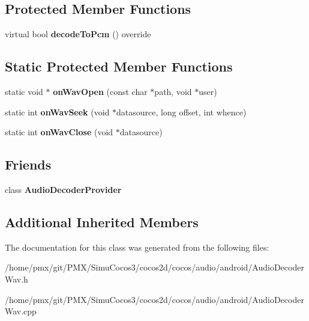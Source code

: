 \subsection*{Protected Member Functions}
\begin{DoxyCompactItemize}
\item 
\mbox{\label{classcocos2d_1_1experimental_1_1AudioDecoderWav_a8dc35ba05d20a358f7da7c50a9421eeb}} 
virtual bool {\bfseries decode\+To\+Pcm} () override
\end{DoxyCompactItemize}
\subsection*{Static Protected Member Functions}
\begin{DoxyCompactItemize}
\item 
\mbox{\label{classcocos2d_1_1experimental_1_1AudioDecoderWav_a69f52fea48fdbafb681dcbc8976777a8}} 
static void $\ast$ {\bfseries on\+Wav\+Open} (const char $\ast$path, void $\ast$user)
\item 
\mbox{\label{classcocos2d_1_1experimental_1_1AudioDecoderWav_afb2afd332edca8b36499f5af5c2cb76e}} 
static int {\bfseries on\+Wav\+Seek} (void $\ast$datasource, long offset, int whence)
\item 
\mbox{\label{classcocos2d_1_1experimental_1_1AudioDecoderWav_aef844d772ae05fcf7a86df585185dd6a}} 
static int {\bfseries on\+Wav\+Close} (void $\ast$datasource)
\end{DoxyCompactItemize}
\subsection*{Friends}
\begin{DoxyCompactItemize}
\item 
\mbox{\label{classcocos2d_1_1experimental_1_1AudioDecoderWav_afb46984384ce8b9caa8516e0a84944ef}} 
class {\bfseries Audio\+Decoder\+Provider}
\end{DoxyCompactItemize}
\subsection*{Additional Inherited Members}


The documentation for this class was generated from the following files\+:\begin{DoxyCompactItemize}
\item 
/home/pmx/git/\+P\+M\+X/\+Simu\+Cocos3/cocos2d/cocos/audio/android/Audio\+Decoder\+Wav.\+h\item 
/home/pmx/git/\+P\+M\+X/\+Simu\+Cocos3/cocos2d/cocos/audio/android/Audio\+Decoder\+Wav.\+cpp\end{DoxyCompactItemize}
